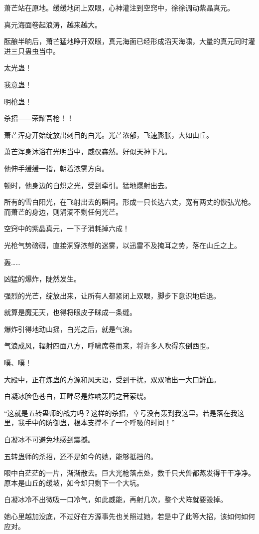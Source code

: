 \begin{this_body}
萧芒站在原地。缓缓地闭上双眼，心神灌注到空窍中，徐徐调动紫晶真元。

真元海面卷起浪涛，越来越大。

酝酿半晌后，萧芒猛地睁开双眼，真元海面已经形成滔天海啸，大量的真元同时灌进三只蛊虫当中。

太光蛊！

我意蛊！

明枪蛊！

杀招――荣耀吾枪！！

萧芒浑身开始绽放出刺目的白光。光芒浓郁，飞速膨胀，大如山丘。

萧芒浑身沐浴在光明当中，威仪森然。好似天神下凡。

他伸手缓缓一指，朝着浓雾方向。

顿时，他身边的白炽之光，受到牵引。猛地爆射出去。

所有的雪白阳光，在飞射出去的瞬间。形成一只长达六丈，宽有两丈的恢弘光枪。而萧芒的身边，则涓滴不剩任何光芒。

空窍中的紫晶真元，一下子消耗掉六成！

光枪气势磅礴，直接洞穿浓郁的迷雾，以迅雷不及掩耳之势，落在山丘之上。

轰……

凶猛的爆炸，陡然发生。

强烈的光芒，绽放出来，让所有人都紧闭上双眼，脚步下意识地后退。

就算是魔无天，也得将眼皮子眯成一条缝。

爆炸引得地动山摇，白光之后，就是气浪。

气浪成风，辐射四面八方，呼啸席卷而来，将许多人吹得东倒西歪。

噗、噗！

大殿中，正在炼蛊的方源和风天语，受到干扰，双双喷出一大口鲜血。

白凝冰脸色苍白，耳畔尽是炸响轰鸣之音萦绕。

“这就是五转蛊师的战力吗？这样的杀招，幸亏没有轰到我这里。若是落在我这里，我手中的防御蛊，根本支撑不了一个呼吸的时间！”

白凝冰不可避免地感到震撼。

五转蛊师的杀招，还不是如今的她，能够抵挡的。

眼中白茫茫的一片，渐渐散去。巨大光枪落点处，数千只犬兽都蒸发得干干净净。原本是山丘的缓坡，如今却只剩下一个大坑。

白凝冰冷不出微吸一口冷气，如此威能，再射几次，整个犬阵就要毁掉。

她心里越加没底，不过好在方源事先也关照过她，若是中了此等大招，该如何如何应对。


\end{this_body}
